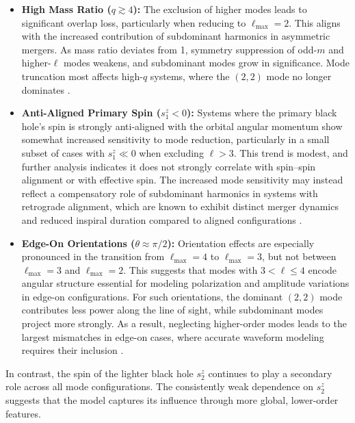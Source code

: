 \documentclass[12pt]{iopart}
\begin{document}
\begin{itemize}
    \item \textbf{High Mass Ratio ($q \gtrsim 4$):} The exclusion of higher modes leads to significant overlap loss, particularly when reducing to $\ell_{\max}=2$. This aligns with the increased contribution of subdominant harmonics in asymmetric mergers. As mass ratio deviates from 1, symmetry suppression of odd-$m$ and higher-$\ell$ modes weakens, and subdominant modes grow in significance. Mode truncation most affects high-$q$ systems, where the $(2,2)$ mode no longer dominates \cite{Berti:2007fi}.

    \item \textbf{Anti-Aligned Primary Spin ($s^z_1 < 0$):} Systems where the primary black hole’s spin is strongly anti-aligned with the orbital angular momentum show somewhat increased sensitivity to mode reduction, particularly in a small subset of cases with $s^z_1 \ll 0$ when excluding $\ell>3$. This trend is modest, and further analysis indicates it does not strongly correlate with spin–spin alignment or with effective spin. The increased mode sensitivity may instead reflect a compensatory role of subdominant harmonics in systems with retrograde alignment, which are known to exhibit distinct merger dynamics and reduced inspiral duration compared to aligned configurations \cite{2006PhRvD..74d1501C,PhysRevD.82.124008}.
    

    \item \textbf{Edge-On Orientations ($\theta \approx \pi/2$):} Orientation effects are especially pronounced in the transition from $\ell_{\max}=4$ to $\ell_{\max}=3$, but not between $\ell_{\max}=3$ and $\ell_{\max}=2$. This suggests that modes with $3 < \ell \leq 4$ 
    encode angular structure essential for modeling polarization and amplitude variations in edge-on configurations. For such orientations, the dominant $(2,2)$ mode contributes less power along the line of sight, while subdominant modes  project more strongly. As a result, neglecting higher-order modes leads to the largest mismatches in edge-on cases, where accurate waveform modeling requires their inclusion \cite{PhysRevD.87.084008}.


\end{itemize}

In contrast, the spin of the lighter black hole $s^z_2$ continues to play a secondary role across all mode configurations. The consistently weak dependence on $s^z_2$ suggests that the model captures its influence through more global, lower-order features.
\end{document}
